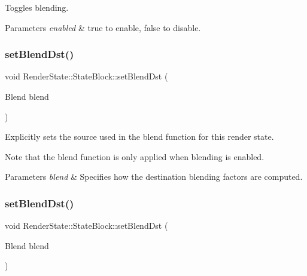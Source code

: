Toggles blending.


\begin{DoxyParams}{Parameters}
{\em enabled} & true to enable, false to disable. \\
\hline
\end{DoxyParams}
\mbox{\label{classRenderState_1_1StateBlock_a20465bd4399b6559ae274f9556abec97}} 
\subsubsection{\texorpdfstring{set\+Blend\+Dst()}{setBlendDst()}\hspace{0.1cm}{\footnotesize\ttfamily [1/2]}}
{\footnotesize\ttfamily void Render\+State\+::\+State\+Block\+::set\+Blend\+Dst (\begin{DoxyParamCaption}\item[{Blend}]{blend }\end{DoxyParamCaption})}

Explicitly sets the source used in the blend function for this render state.

Note that the blend function is only applied when blending is enabled.


\begin{DoxyParams}{Parameters}
{\em blend} & Specifies how the destination blending factors are computed. \\
\hline
\end{DoxyParams}
\mbox{\label{classRenderState_1_1StateBlock_a20465bd4399b6559ae274f9556abec97}} 
\subsubsection{\texorpdfstring{set\+Blend\+Dst()}{setBlendDst()}\hspace{0.1cm}{\footnotesize\ttfamily [2/2]}}
{\footnotesize\ttfamily void Render\+State\+::\+State\+Block\+::set\+Blend\+Dst (\begin{DoxyParamCaption}\item[{Blend}]{blend }\end{DoxyParamCaption})}

